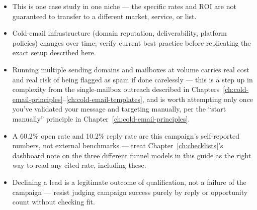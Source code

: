 \begin{itemize}
  \item This is one case study in one niche — the specific rates and ROI are not guaranteed to transfer to a
  different market, service, or list.
  \item Cold-email infrastructure (domain reputation, deliverability, platform policies) changes over time;
  verify current best practice before replicating the exact setup described here.
  \item Running multiple sending domains and mailboxes at volume carries real cost and real risk of being flagged
  as spam if done carelessly — this is a step up in complexity from the single-mailbox outreach described in
  Chapters~\ref{ch:cold-email-principles}--\ref{ch:cold-email-templates}, and is worth attempting only once
  you've validated your message and targeting manually, per the ``start manually'' principle in
  Chapter~\ref{ch:cold-email-principles}.
  \item A 60.2\% open rate and 10.2\% reply rate are this campaign's self-reported numbers, not external
  benchmarks — treat Chapter~\ref{ch:checklists}'s dashboard note on the three different funnel models in this
  guide as the right way to read any cited rate, including these.
  \item Declining a lead is a legitimate outcome of qualification, not a failure of the campaign — resist judging
  campaign success purely by reply or opportunity count without checking fit.
\end{itemize}

